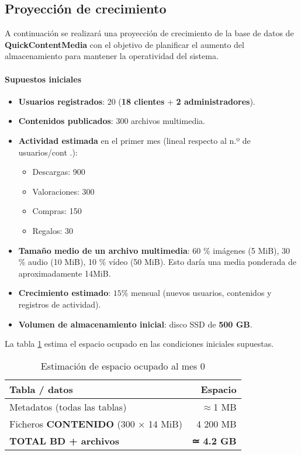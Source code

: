 \subsection{Proyección de crecimiento}
A continuación se realizará una proyección de crecimiento de la base de datos de \textbf{QuickContentMedia} con el objetivo de planificar el aumento del almacenamiento para mantener la operatividad del sistema.

\paragraph*{Supuestos iniciales}

\begin{itemize}
  \item \textbf{Usuarios registrados}: 20  
        (\textbf{18 clientes} + \textbf{2 administradores}).
  \item \textbf{Contenidos publicados}: 300 archivos multimedia.
  \item \textbf{Actividad estimada} en el primer mes  
        (lineal respecto al n.º de usuarios/cont .):
        \begin{itemize}
          \item Descargas: 900
          \item Valoraciones: 300
          \item Compras: 150
          \item Regalos: 30
        \end{itemize}
  \item \textbf{Tamaño medio de un archivo multimedia}:  
        60 \% imágenes (5 MiB), 30 \% audio (10 MiB), 10 \% vídeo (50 MiB). Esto daría una media ponderada de aproximadamente 14MiB.
  \item \textbf{Crecimiento estimado}: $15\%$ mensual
        (nuevos usuarios, contenidos y registros de actividad).
  \item \textbf{Volumen de almacenamiento inicial}:  
        disco SSD de \textbf{500 GB}.
\end{itemize}

La tabla \ref{tab:tam-inicial} estima el espacio ocupado en las condiciones iniciales supuestas.

\begin{longtable}{|l|r|}
\caption{Estimación de espacio ocupado al mes 0}\label{tab:tam-inicial}\\\hline
\textbf{Tabla / datos} & \textbf{Espacio}\\\hline
Metadatos (todas las tablas) & $\approx$1 MB\\
Ficheros \textbf{CONTENIDO} (300 × 14 MiB) & 4 200 MB\\\hline
\textbf{TOTAL BD + archivos} & \textbf{≃ 4.2 GB}\\\hline
\end{longtable}


